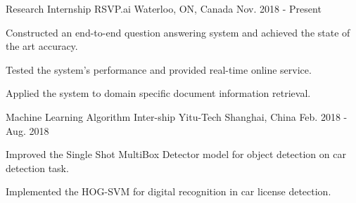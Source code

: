

\begin{cventries}

  \cventry
    {Research Internship} %
    {RSVP.ai} %
    {Waterloo, ON, Canada} %
    {Nov. 2018 - Present} %
    {
      \begin{cvitems} %
        \item {Constructed an end-to-end question answering system and achieved the state of the art accuracy.}
        \item {Tested the system's performance and provided real-time online service.}
        \item {Applied the system to domain specific document information retrieval.}
      \end{cvitems}
    }
\cventry
    {Machine Learning Algorithm Inter-ship} %
    {Yitu-Tech} %
    {Shanghai, China} %
    {Feb. 2018 - Aug. 2018} %
    {
      \begin{cvitems} %
        \item {Improved the Single Shot MultiBox Detector model for object detection on car detection task.}
        \item {Implemented the HOG-SVM for digital recognition in car license detection.}
      \end{cvitems}
    }
        
\end{cventries}
